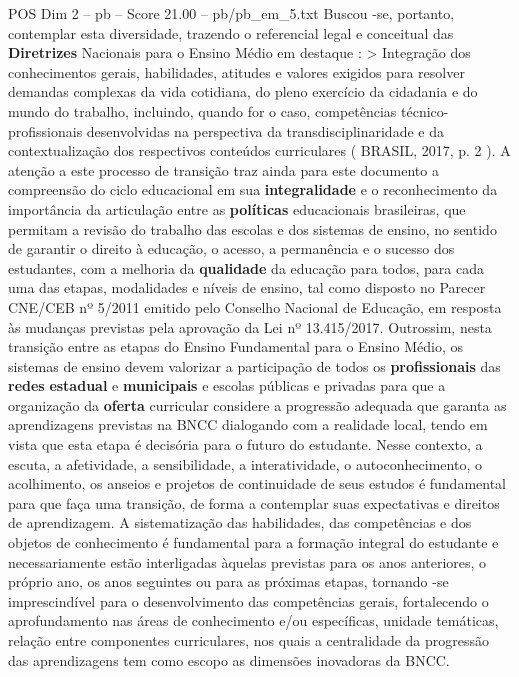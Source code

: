 \begin{textsample}{POS Dim 2 – pb – Score 21.00 – pb/pb\_em\_5.txt}
Buscou -se, portanto, contemplar esta diversidade, trazendo o referencial legal e conceitual das \textbf{Diretrizes} Nacionais para o Ensino Médio em destaque : > Integração dos conhecimentos gerais, habilidades, atitudes e valores exigidos para resolver demandas complexas da vida cotidiana, do pleno exercício da cidadania e do mundo do trabalho, incluindo, quando for o caso, competências técnico-profissionais desenvolvidas na perspectiva da transdisciplinaridade e da contextualização dos respectivos conteúdos curriculares ( BRASIL, 2017, p. 2 ).
A atenção a este processo de transição traz ainda para este documento a compreensão do ciclo educacional em sua \textbf{integralidade} e o reconhecimento da importância da articulação entre as \textbf{políticas} educacionais brasileiras, que permitam a revisão do trabalho das escolas e dos sistemas de ensino, no sentido de garantir o direito à educação, o acesso, a permanência e o sucesso dos estudantes, com a melhoria da \textbf{qualidade} da educação para todos, para cada uma das etapas, modalidades e níveis de ensino, tal como disposto no Parecer CNE/CEB nº 5/2011 emitido pelo Conselho Nacional de Educação, em resposta às mudanças previstas pela aprovação da Lei nº 13.415/2017.
Outrossim, nesta transição entre as etapas do Ensino Fundamental para o Ensino Médio, os sistemas de ensino devem valorizar a participação de todos os \textbf{profissionais} das \textbf{redes} \textbf{estadual} e \textbf{municipais} e escolas públicas e privadas para que a organização da \textbf{oferta} curricular considere a progressão adequada que garanta as aprendizagens previstas na BNCC dialogando com a realidade local, tendo em vista que esta etapa é decisória para o futuro do estudante.
Nesse contexto, a escuta, a afetividade, a sensibilidade, a interatividade, o autoconhecimento, o acolhimento, os anseios e projetos de continuidade de seus estudos é fundamental para que faça uma transição, de forma a contemplar suas expectativas e direitos de aprendizagem.
A sistematização das habilidades, das competências e dos objetos de conhecimento é fundamental para a formação integral do estudante e necessariamente estão interligadas àquelas previstas para os anos anteriores, o próprio ano, os anos seguintes ou para as próximas etapas, tornando -se imprescindível para o desenvolvimento das competências gerais, fortalecendo o aprofundamento nas áreas de conhecimento e/ou específicas, unidade temáticas, relação entre componentes curriculares, nos quais a centralidade da progressão das aprendizagens tem como escopo as dimensões inovadoras da BNCC.

\end{textsample}
